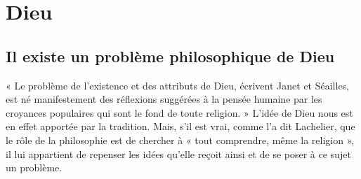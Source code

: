 \chapter{Dieu}

\section{Il existe un problème philosophique de Dieu}%
« Le
problème de l'existence et des attributs de Dieu, écrivent Janet et
Séailles, est né manifestement des réflexions suggérées à la pensée
humaine par les croyances populaires qui sont le fond de toute religion. »
L'idée de Dieu nous est en effet apportée par la tradition.
Mais, s’il est vrai, comme l’a dit Lachelier, que le rôle de la philosophie
est de chercher à « tout comprendre, même la religion », il lui
appartient de repenser les idées qu’elle reçoit ainsi et de se poser
à ce sujet un problème.


